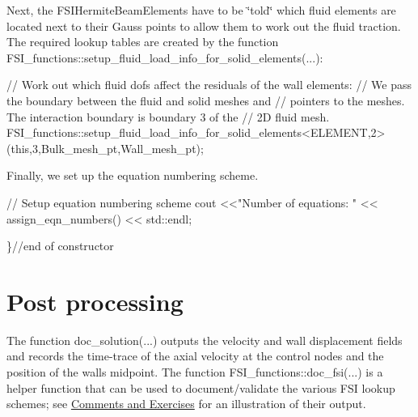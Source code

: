 Next, the {\ttfamily F\+S\+I\+Hermite\+Beam\+Elements} have to be \char`\"{}told\char`\"{} which fluid elements are located next to their Gauss points to allow them to work out the fluid traction. The required lookup tables are created by the function {\ttfamily F\+S\+I\+\_\+functions\+::setup\+\_\+fluid\+\_\+load\+\_\+info\+\_\+for\+\_\+solid\+\_\+elements}(...)\+:


\begin{DoxyCodeInclude}
  
  
 \textcolor{comment}{// Work out which fluid dofs affect the residuals of the wall elements:}
 \textcolor{comment}{// We pass the boundary between the fluid and solid meshes and }
 \textcolor{comment}{// pointers to the meshes. The interaction boundary is boundary 3 of the }
 \textcolor{comment}{// 2D fluid mesh.}
 FSI\_functions::setup\_fluid\_load\_info\_for\_solid\_elements<ELEMENT,2>
  (\textcolor{keyword}{this},3,Bulk\_mesh\_pt,Wall\_mesh\_pt);

\end{DoxyCodeInclude}


Finally, we set up the equation numbering scheme.


\begin{DoxyCodeInclude}
  
 \textcolor{comment}{// Setup equation numbering scheme}
 cout <<\textcolor{stringliteral}{"Number of equations: "} << assign\_eqn\_numbers() << std::endl; 
  

\}\textcolor{comment}{//end of constructor}

\end{DoxyCodeInclude}




 

\hypertarget{index_doc}{}\section{Post processing}\label{index_doc}
The function {\ttfamily doc\+\_\+solution}(...) outputs the velocity and wall displacement fields and records the time-\/trace of the axial velocity at the control nodes and the position of the wall\textquotesingle{}s midpoint. The function {\ttfamily F\+S\+I\+\_\+functions\+::doc\+\_\+fsi}(...) is a helper function that can be used to document/validate the various F\+SI lookup schemes; see \hyperlink{index_comments_and_ex}{Comments and Exercises} for an illustration of their output.


